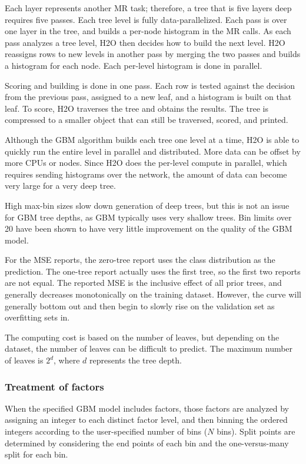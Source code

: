 \documentclass[11pt]{article}
\begin{document}
{Each layer represents another MR task; therefore, a tree that is five layers deep requires five passes. Each tree level is fully data-parallelized. Each pass is over one layer in the tree, and builds a per-node histogram in the MR calls. As each pass analyzes a tree level, H2O then decides how to build the next level. H2O reassigns rows to new levels in another pass by merging the two passes and builds a histogram for each node. Each per-level histogram is done in parallel. 

Scoring and building is done in one pass. Each row is tested against the decision from the previous pass, assigned to a new leaf, and a histogram is built on that leaf. To score, H2O traverses the tree and obtains the results. The tree is compressed to a smaller object that can still be traversed, scored, and printed. 

Although the GBM algorithm builds each tree one level at a time, H2O is able to quickly run the entire level in parallel and distributed. More data can be offset by more CPUs or nodes.  Since H2O does the per-level compute in parallel, which requires sending histograms over the network, the amount of data can become very large for a very deep tree. 

High max-bin sizes slow down generation of deep trees, but this is not an issue for GBM tree depths, as GBM typically uses very shallow trees. Bin limits over 20 have been shown to have very little improvement on the quality of the GBM model. 

For the MSE reports, the zero-tree report uses the class distribution as the prediction. The one-tree report actually uses the first tree, so the first two reports are not equal. The reported MSE is the inclusive effect of all prior trees, and generally decreases monotonically on the training dataset. However, the curve will generally bottom out and then begin to slowly rise on the validation set as overfitting sets in. 

The computing cost is based on the number of leaves, but depending on the dataset, the number of leaves can be difficult to predict. The maximum number of leaves is $2^d$, where $d$ represents the tree depth.

\subsubsection{Treatment of factors}

When the specified GBM model includes factors, those factors are analyzed by assigning an integer to each distinct factor level, and then binning the ordered integers according to the user-specified number of bins ($N$ bins). Split points are determined by considering the end points of each bin and the one-versus-many split for each bin. 

}
\end{document}
